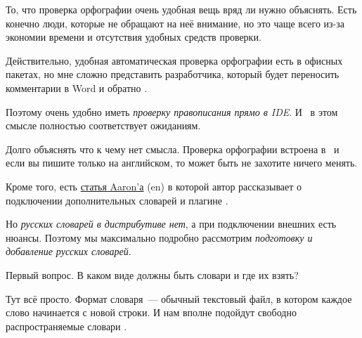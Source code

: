 То, что проверка орфографии очень удобная вещь вряд ли нужно объяснять. Есть
конечно люди, которые не обращают на неё внимание, но это чаще всего из-за
экономии времени и отсутствия удобных средств проверки.

Действительно, удобная автоматическая проверка орфографии есть в офисных
пакетах, но мне сложно представить разработчика, который будет переносить
комментарии в Word и обратно \smiley.

Поэтому очень удобно иметь \emph{проверку правописания прямо в IDE}. И \eclipse\
в этом смысле полностью соответствует ожиданиям.

Долго объяснять что к чему нет смысла. Проверка орфографии встроена в \eclipse\
и если вы пишите только на английском, то может быть не захотите ничего менять.

Кроме того, есть
\href{http://www.102degrees.com/blog/2007/07/09/spell-checking-in-eclipse-pdt/}{статья
Aaron'а} (en) в которой автор рассказывает о подключении дополнительных словарей
и плагине \file{eSpell}.

Но \emph{русских словарей в дистрибутиве нет}, а при подключении внешних есть
нюансы. Поэтому мы максимально подробно рассмотрим \emph{подготовку и добавление
русских словарей}.

Первый вопрос. В каком виде должны быть словари и где их взять?

Тут всё просто. Формат словаря\ --- обычный текстовый файл, в котором каждое
слово начинается с новой строки. И нам вполне подойдут свободно распространяемые
словари \file{aSpell}.

